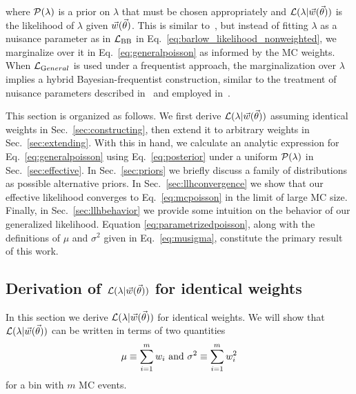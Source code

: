 where $\mathcal{P}(\lambda)$ is a prior on $\lambda$ that must be chosen appropriately and $\mathcal{L}(\lambda|\vec{w}(\vec{\theta}))$ is the likelihood of $\lambda$ given $\vec{w}(\vec{\theta})$. This is similar to~\cite{Barlow:1993dm, Cranmer:2012sba}, but instead of fitting $\lambda$ as a nuisance parameter as in $\mathcal{L}_{\textmd{BB}}$ in Eq.~\eqref{eq:barlow_likelihood_nonweighted}, we marginalize over it in Eq.~\eqref{eq:generalpoisson} as informed by the MC weights. When $\mathcal{L}_{\textrm General}$ is used under a frequentist approach, the marginalization over $\lambda$ implies a hybrid Bayesian-frequentist construction, similar to the treatment of nuisance parameters described in~\cite{Cousins:1991qz} and employed in~\cite{Abe:2017vif, Abe:2018wpn}.

This section is organized as follows. We first derive $\mathcal{L}(\lambda|\vec{w}(\vec{\theta}))$ assuming identical weights in Sec.~\ref{sec:constructing}, then extend it to arbitrary weights in Sec.~\ref{sec:extending}. With this in hand, we calculate an analytic expression for Eq.~\eqref{eq:generalpoisson} using Eq.~\eqref{eq:posterior} under a uniform $\mathcal{P}(\lambda)$ in Sec.~\ref{sec:effective}. In Sec.~\ref{sec:priors} we briefly discuss a family of distributions as possible alternative priors. In Sec.~\ref{sec:llhconvergence} we show that our effective likelihood converges to Eq.~\eqref{eq:mcpoisson} in the limit of large MC size. Finally, in Sec.~\ref{sec:llhbehavior} we provide some intuition on the behavior of our generalized likelihood. Equation \eqref{eq:parametrizedpoisson}, along with the definitions of $\mu$ and $\sigma^2$ given in Eq.~\eqref{eq:musigma}, constitute the primary result of this work.

\subsection{Derivation of $\mathcal{L} (\lambda|\vec{w}(\vec{\theta}))$ for identical weights\label{sec:constructing}}
In this section we derive $\mathcal{L}(\lambda|\vec{w}(\vec{\theta}))$ for identical weights. We will show that $\mathcal{L}(\lambda|\vec{w}(\vec{\theta}))$ can be written in terms of two quantities
\begin{equation}\label{eq:musigma}
\mu \equiv \sum_{i=1}^m w_i~\textmd{and}~\sigma^2 \equiv \sum_{i=1}^m w_i^2
\end{equation}
for a bin with $m$ MC events.

